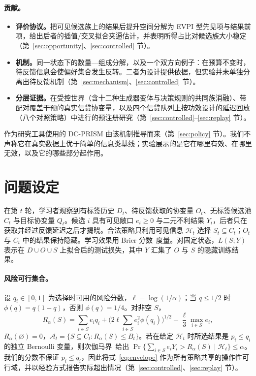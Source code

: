\documentclass[runningheads]{llncs}
\begin{document}
\paragraph{贡献。}
\begin{itemize}
\item \textbf{评价协议。}把可见候选族上的结果后提升空间分解为 EVPI 型先见项与结果前项，给出后者的插值/交叉拟合夹逼估计，并表明所得占比对候选族大小稳定（第~\ref{sec:opportunity}、\ref{sec:controlled} 节）。
\item \textbf{机制。}同一状态下的数量—组成分解，以及一个双方向例子：在预算不变时，待反馈信息会使偏好集合发生反转。二者为设计提供依据，但实验并未单独分离出待反馈机制（第~\ref{sec:mechanism}、\ref{sec:controlled} 节）。
\item \textbf{分层证据。}在受控世界（含十二种生成器变体与决策规则的共同族消融）、带配对覆盖干预的真实信贷协变量，以及四个信贷队列上按功效设计的延迟回放（八个对照策略）中进行的预注册研究（第~\ref{sec:controlled}--\ref{sec:replay} 节）。
\end{itemize}
作为研究工具使用的 DC-PRISM 由该机制推导而来（第~\ref{sec:policy} 节）。我们不声称它在真实数据上优于简单的信息类基线；实验展示的是它在哪里有效、在哪里无效，以及它的哪些部分起作用。

\section{问题设定}
\label{sec:setting}
在第 $t$ 轮，学习者观察到有标签历史 $D_t$、待反馈获取的协变量 $O_t$、无标签候选池 $C_t$ 与目标协变量 $Q_t$。候选 $i$ 具有可见敞口 $e_i\geq0$ 与二元不利结果 $Y_i$，后者只在获取并经过反馈延迟之后才揭晓。合法策略只利用可见信息 $\mathcal H_t$ 选择 $S_t\subseteq C_t$；$O_t$ 与 $C_t$ 中的结果保持隐藏。学习效果用 Brier 分数~\cite{brier1950verification}度量。对固定状态，$L(S;Y)$ 表示在 $D\cup O\cup S$ 上拟合后的测试损失，其中 $Y$ 汇集了 $O$ 与 $S$ 的隐藏训练结果。

\paragraph{风险可行集合。}设 $q_i\in[0,1]$ 为选择时可用的风险分数，$\ell=\log(1/\alpha)$；当 $q\le1/2$ 时 $\phi(q)=q(1-q)$，否则 $\phi(q)=1/4$。对非空 $S$，
\begin{equation}
 R_\alpha(S)=\sum_{i\in S}e_iq_i+\Big(2\ell\sum_{i\in S}e_i^2\phi(q_i)\Big)^{1/2}+\frac{\ell}{3}\max_{i\in S}e_i,
 \label{eq:envelope}
\end{equation}
$R_\alpha(\varnothing)=0$，$\mathcal A_t=\{S\subseteq C_t:R_\alpha(S)\le B_t\}$。若在给定 $\mathcal H_t$ 时所选结果是 $p_i\le q_i$ 的独立 Bernoulli 变量，则次伽马界~\cite{boucheron2013concentration}给出 $\Pr\{\sum_{i\in S}e_iY_i>R_\alpha(S)\mid\mathcal H_t\}\le\alpha$。我们的分数不保证 $p_i\le q_i$，因此将式~\eqref{eq:envelope} 作为所有策略共享的操作性可行域，并以经验方式报告实际超出情况（第~\ref{sec:controlled}、\ref{sec:replay} 节）。
\end{document}

